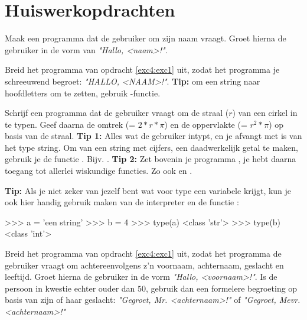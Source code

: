 \section{Huiswerkopdrachten}
\begin{exercise} \label{exc4:exc1}
Maak een programma dat de gebruiker om zijn naam vraagt. Groet hierna de gebruiker in de vorm van \textit{"Hallo, <naam>!"}.
\end{exercise}

\begin{exercise}
Breid het programma van opdracht \ref{exc4:exc1} uit, zodat het programma je schreeuwend begroet: \textit{"HALLO, <NAAM>!"}. \newline
\textbf{Tip:} om een string naar hoofdletters om te zetten, gebruik -functie.
\end{exercise}

\begin{exercise}
Schrijf een programma dat de gebruiker vraagt om de straal ($r$) van een cirkel in te typen. Geef daarna de omtrek (= $2*r*\pi$) en de oppervlakte (= $r^2*\pi$) op basis van de straal. \newline \newline
\textbf{Tip 1:} Alles wat de gebruiker intypt, en je afvangt met  is van het type string. Om van een string met cijfers, een daadwerkelijk getal te maken, gebruik je de functie . Bijv. .\newline \newline
\textbf{Tip 2:} Zet bovenin je programma , je hebt daarna toegang tot allerlei wiskundige functies. Zo ook  en .
\end{exercise}

\begin{remark}
\textbf{Tip:} Als je niet zeker van jezelf bent wat voor type een variabele krijgt, kun je ook hier handig gebruik maken van de interpreter en de functie :
\begin{python}
>>> a = 'een string'
>>> b = 4
>>> type(a)
<class 'str'>
>>> type(b)
<class 'int'>
\end{python}
\end{remark}

\begin{exercise}
Breid het programma van opdracht \ref{exc4:exc1} uit, zodat het programma de gebruiker vraagt om achtereenvolgens z'n voornaam, achternaam, geslacht en leeftijd. \newline
Groet hierna de gebruiker in de vorm \textit{"Hallo, <voornaam>!"}. \newline
Is de persoon in kwestie echter ouder dan $50$, gebruik dan een formelere begroeting op basis van zijn of haar geslacht: \textit{"Gegroet, Mr. <achternaam>!"} of \textit{"Gegroet, Mevr. <achternaam>!"}
\end{exercise}

